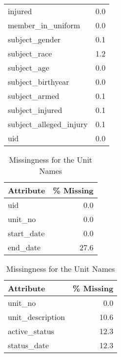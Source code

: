 \begin{table}
\begin{minipage}[t]{0.48\textwidth}
\begin{tabular}{lr}
                     injured &        0.0 \\
           member\_in\_uniform &        0.0 \\
              subject\_gender &        0.1 \\
                subject\_race &        1.2 \\
                 subject\_age &        0.0 \\
           subject\_birthyear &        0.0 \\
               subject\_armed &        0.1 \\
             subject\_injured &        0.1 \\
      subject\_alleged\_injury &        0.1 \\
                         uid &        0.0 \\
\bottomrule
\end{tabular}
\end{minipage}
\end{table}

\begin{table}
	\begin{minipage}[t]{0.48\textwidth}
		\centering
		\caption{Missingness for Unit Assignments}
\begin{tabular}{lr}
\toprule
 Attribute &  \% Missing \\
\midrule
       uid &        0.0 \\
   unit\_no &        0.0 \\
start\_date &        0.0 \\
  end\_date &       27.6 \\
\bottomrule
\end{tabular}
\end{minipage}\hfill
\begin{minipage}[t]{0.48\textwidth}
		\centering
		\caption{Missingness for the Unit Names}
\centering 
\begin{tabular}{lr}
\toprule
       Attribute &  \% Missing \\
\midrule
         unit\_no &        0.0 \\
unit\_description &       10.6 \\
   active\_status &       12.3 \\
     status\_date &       12.3 \\
\bottomrule
\end{tabular}
\end{minipage}
\end{table}

